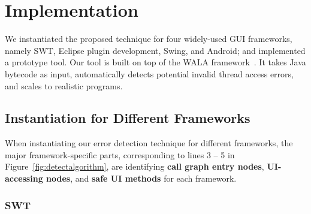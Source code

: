 \section{Implementation}
\label{sec:implementation}

We instantiated the proposed technique for four widely-used
GUI frameworks, namely SWT, Eclipse plugin development, Swing, and Android;
and implemented a prototype tool.
Our tool is built on top of the WALA framework~\cite{walatutorial}.
It takes Java bytecode as input, 
automatically detects potential invalid thread access
errors, and scales to realistic programs.  





\subsection{Instantiation for Different Frameworks}
\label{sec:platforms}

When instantiating our error detection technique for different
frameworks, the major framework-specific parts, corresponding to
lines 3 -- 5 in Figure~\ref{fig:detectalgorithm}, are identifying
\textbf{call graph entry nodes}, \textbf{UI-accessing nodes},
and \textbf{safe UI methods} for each framework.






\subsubsection{SWT}

